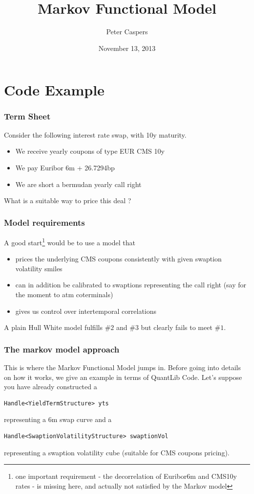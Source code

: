 \documentclass{beamer}
\begin{document}
\title{Markov Functional Model}  
\author{Peter Caspers}
\date{November 13, 2013} 

\frame{\titlepage} 


\section{Code Example}

\begin{frame}
\frametitle{Term Sheet}
Consider the following interest rate swap, with 10y maturity.
\begin{itemize}
\item We receive yearly coupons of type EUR CMS 10y
\item We pay Euribor 6m + 26.7294bp
\item We are short a bermudan yearly call right
\end{itemize}
 What is a suitable way to price this deal ?
\end{frame}


\begin{frame}
\frametitle{Model requirements}
A good start\footnote{one important requirement - the decorrelation of Euribor6m and CMS10y rates - is missing here, and actually not satisfied by the Markov model} would be to use a model that
\begin{itemize}
\item prices the underlying CMS coupons consistently with given swaption volatility smiles
\item can in addition be calibrated to swaptions representing the call right (say for the moment to atm coterminals)
\item gives us control over intertemporal correlations
\end{itemize}
A plain Hull White model fulfills $\#2$ and $\#3$ but clearly fails to meet $\#1$.
\end{frame}



\begin{frame}[fragile]
\frametitle{The markov model approach}
This is where the Markov Functional Model jumps in. Before going into details on how it works, we give
an example in terms of QuantLib Code. Let's suppose you have already constructed a 
\begin{verbatim}
Handle<YieldTermStructure> yts
\end{verbatim}
representing a 6m swap curve and a 
\begin{verbatim}
Handle<SwaptionVolatilityStructure> swaptionVol
\end{verbatim}
representing a swaption volatility cube (suitable for CMS coupons pricing).
\end{frame}
\end{document}
